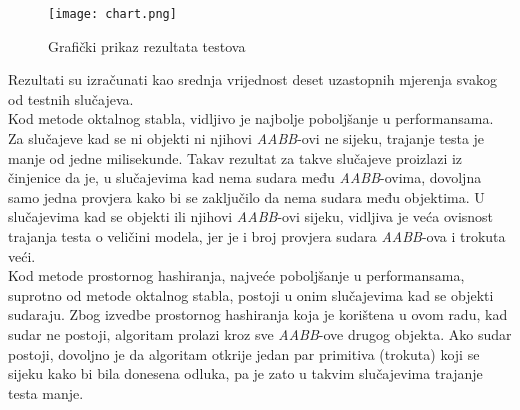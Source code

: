 \begin{figure}[h!]
    \centering
    \texttt{[image: chart.png]}
    \caption {Grafički prikaz rezultata testova}
    \label{testresults}
\end{figure}

\pagebreak

Rezultati su izračunati kao srednja vrijednost deset uzastopnih mjerenja svakog od testnih slučajeva.\\
Kod metode oktalnog stabla, vidljivo je najbolje poboljšanje u performansama. Za slučajeve kad se
ni objekti ni njihovi \textit{AABB}-ovi ne sijeku, trajanje testa je manje od jedne milisekunde.
Takav rezultat za takve slučajeve proizlazi iz činjenice da je, u slučajevima kad nema sudara među
\textit{AABB}-ovima, dovoljna samo jedna provjera kako bi se zaključilo da nema sudara među objektima.
U slučajevima kad se objekti ili njihovi \textit{AABB}-ovi sijeku, vidljiva je veća ovisnost trajanja
testa o veličini modela, jer je i broj provjera sudara \textit{AABB}-ova i trokuta veći.\\
Kod metode prostornog hashiranja, najveće poboljšanje u performansama, suprotno od metode oktalnog stabla,
postoji u onim slučajevima kad se objekti sudaraju. Zbog izvedbe prostornog hashiranja koja je korištena u
ovom radu, kad sudar ne postoji, algoritam prolazi kroz sve \textit{AABB}-ove drugog objekta. Ako sudar
postoji, dovoljno je da algoritam otkrije jedan par primitiva (trokuta) koji se sijeku kako bi bila
donesena odluka, pa je zato u takvim slučajevima trajanje testa manje.
